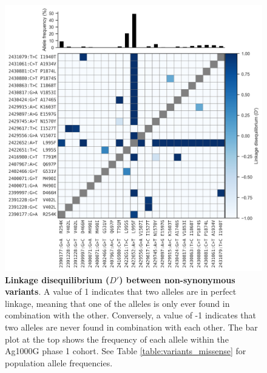 \documentclass[a4paper,11pt,abstracton,hidelinks]{scrartcl}
\begin{document}
%
\begin{figure}[!t]

  \centering

  \includegraphics[width=\linewidth]{artwork/figure_Phase_2_vgsc_LD.png}

  \caption{\textbf{Linkage disequilibrium ($D'$) between non-synonymous variants}. A value of 1 indicates that two alleles are in perfect linkage, meaning that one of the alleles is only ever found in combination with the other. Conversely, a value of -1 indicates that two alleles are never found in combination with each other. The bar plot at the top shows the frequency of each allele within the Ag1000G phase 1 cohort. See Table \ref{table:variants_missense} for population allele frequencies.}

  \label{fig:ld}

\end{figure}
\end{document}
